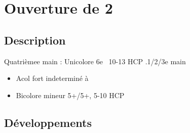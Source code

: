 \documentclass[a4paper]{article}
\begin{document}
\section{Ouverture de 2\pdfs}

\subsection{Description}

Quatrièmee main : Unicolore 6e \s\ 10-13 HCP .1/2/3e main

\begin{itemize}
\item Acol fort indeterminé à \s\ 

\item Bicolore mineur 5+/5+, 5-10 HCP

\end{itemize}

\subsection{Développements}
\end{document}
